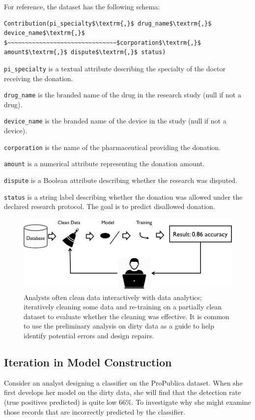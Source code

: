 For reference, the dataset has the following schema:
\begin{lstlisting}[mathescape,basicstyle={\small}]
Contribution(pi_specialty$\textrm{,}$ drug_name$\textrm{,}$ device_name$\textrm{,}$
$~~~~~~~~~~~~~~~~~~~~~~~~~~~~~~~$corporation$\textrm{,}$ amount$\textrm{,}$ dispute$\textrm{,}$ status)
\end{lstlisting}

\noindent\texttt{pi\_specialty} is a textual attribute describing the specialty of the doctor receiving the donation.

\noindent\texttt{drug\_name} is the branded name of the drug in the research study (null if not a drug).

\noindent\texttt{device\_name} is the branded name of the device in the study (null if not a device).

\noindent\texttt{corporation} is the name of the pharmaceutical providing the donation.

\noindent\texttt{amount} is a numerical attribute representing the donation amount.

\noindent\texttt{dispute} is a Boolean attribute describing whether the research was disputed.

\noindent\texttt{status} is a string label describing whether the  donation was allowed under the declared research protocol. The goal is to predict disallowed  donation. 


\begin{figure}[t]
\centering
 \includegraphics[width=0.8\columnwidth]{figs/workflow.png}
 \caption{Analysts often clean data interactively with data analytics; iteratively cleaning some data and re-training on a partially clean dataset to evaluate whether the cleaning was effective. It is common to use the preliminary analysis on dirty data as a guide to help identify potential errors and design repairs. \label{cartoon}}
\end{figure}

\subsection{Iteration in Model Construction}\label{alcmp}
Consider an analyst designing a classifier on the ProPublica dataset.
When she first develops her model on the dirty data, she will find that the detection rate (true positives predicted) is quite low 66\%.
To investigate why she might examine those records that are incorrectly predicted by the classifier.

